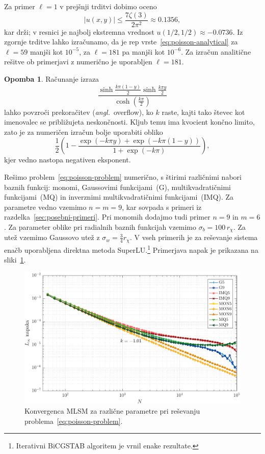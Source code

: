 \documentclass[12pt,a4paper,twoside]{article}
\theoremstyle{definition} %
\newtheorem{opomba}[definicija]{Opomba}
\theoremstyle{plain} %
\numberwithin{equation}{section}
\newcommand{\ang}[1]{(\hspace{-1.5px}\textit{angl.}\ #1)}
\newlength{\iw}
\begin{document}
Za primer $\ell = 1$  v prejšnji trditvi dobimo oceno
\begin{equation}
   |u(x, y)| \leq \frac{7 \zeta(3)}{2 \pi^2} \approx 0.1356,
\end{equation}
kar drži; v resnici je najbolj ekstremna vrednost $u(1/2, 1/2) \approx -0.0736$.
Iz zgornje trditve lahko izračunamo, da je rep
vrste~\eqref{eq:poisson-analytical} za $\ell = 59$ manjši kot $10^{-5}$, za
$\ell = 181$ pa manjši kot $10^{-6}$. Za izračun analitične rešitve ob
primerjavi z numerično je uporabljen $\ell = 181$.
\begin{opomba}
  Računanje izraza
  \begin{equation}
   \frac{\sinh \frac{k \pi  (1-y)}{2} \sinh \frac{k \pi y}{2}}{\cosh(\frac{k\pi}{2})}
  \end{equation}
  lahko povzroči prekoračitev \ang{overflow}, ko $k$ raste, kajti tako števec kot imenovalec se
  približujeta neskončnosti. Kljub temu ima kvocient končno limito, zato je za numeričen izračun
  bolje uporabiti obliko
  \begin{equation}
    \frac12\left( 1 - \frac{\exp(-k\pi y) + \exp(-k\pi(1-y)) }{1 + \exp(-k\pi)}\right),
  \end{equation}
  kjer vedno nastopa negativen eksponent.
\end{opomba}

Rešimo problem~\eqref{eq:poisson-problem} numerično, s štirimi različnimi nabori baznih funkcij:
monomi, Gaussovimi funkcijami~(G), multikvadratičnimi funkcijami~(MQ) in inverznimi
multikvadratičnimi funkcijami~(IMQ).  Za parametre vedno vzemimo $n = m = 9$, kar sovpada s primeri
iz razdelka~\ref{sec:posebni-primeri}. Pri monomih dodajmo tudi primer $n = 9$ in $m = 6$. Za
parameter oblike pri radialnih baznih funkcijah vzemimo $\sigma_b = 100\, r_\chi$. Za utež vzemimo
Gaussovo utež z $\sigma_w = \frac34 r_\chi$. V vseh primerih je za reševanje sistema enačb
uporabljena direktna metoda SuperLU.\footnote{Iterativni BiCGSTAB algoritem je vrnil enake
rezultate.} Primerjava napak je prikazana na sliki~\ref{fig:poisson-square-convergence}.

\begin{figure}[h]
  \centering
  \includegraphics[width=\iw]{images/poisson_square_convergence.pdf}
  \caption[Konvergenca MLSM pri reševanju Poissonove enačbe]{Konvergenca MLSM
  za različne parametre pri reševanju problema~\eqref{eq:poisson-problem}.}
  \label{fig:poisson-square-convergence}
\end{figure}
\end{document}
